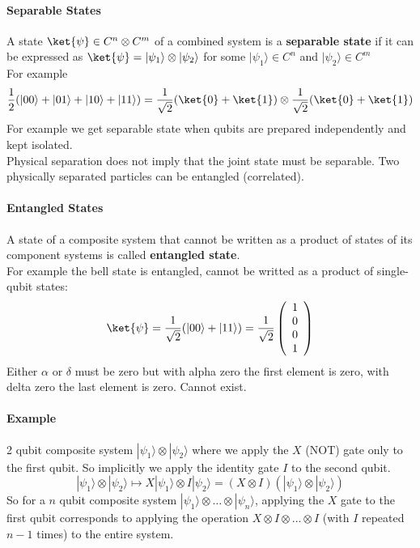 \documentclass[10pt]{report}
\begin{document}
\paragraph{Separable States} A state $\ket{\psi}\in C^n\otimes C^m$ of a combined system is a \textbf{separable state} if it can be expressed as $\ket{\psi} = |\psi_1\rangle\otimes|\psi_2\rangle$ for some $|\psi_1\rangle\in C^n$ and $|\psi_2\rangle\in C^m$\\
For example $$\frac{1}{2}(|00\rangle+|01\rangle+|10\rangle+|11\rangle) = \frac{1}{\sqrt{2}}(\ket{0} + \ket{1})\otimes \frac{1}{\sqrt{2}}(\ket{0}+\ket{1})$$
For example we get separable state when qubits are prepared independently and kept isolated.\\
Physical separation does not imply that the joint state must be separable. Two physically separated particles can be entangled (correlated).
\paragraph{Entangled States} A state of a composite system that cannot be written as a product of states of its component systems is called \textbf{entangled state}.\\
For example the bell state is entangled, cannot be writted as a product of single-qubit states:
$$\ket{\psi}=\frac{1}{\sqrt{2}}(|00\rangle+|11\rangle) = \frac{1}{\sqrt{2}}\left(\begin{array}{c}
1\\0\\0\\1
\end{array}\right)$$
Either $\alpha$ or $\delta$ must be zero but with alpha zero the first element is zero, with delta zero the last element is zero. Cannot exist.
\paragraph{Example} 2 qubit composite system $|\psi_1\rangle\otimes|\psi_2\rangle$ where we apply the $X$ (NOT) gate only to the first qubit. So implicitly we apply the identity gate $I$ to the second qubit.
$$|\psi_1\rangle\otimes|\psi_2\rangle\mapsto X|\psi_1\rangle\otimes I|\psi_2\rangle = (X\otimes I)(|\psi_1\rangle\otimes|\psi_2\rangle)$$
So for a $n$ qubit composite system $|\psi_1\rangle\otimes\ldots\otimes|\psi_n\rangle$, applying the $X$ gate to the first qubit corresponds to applying the operation $X\otimes I\otimes\ldots\otimes I$ (with $I$ repeated $n-1$ times) to the entire system.
\end{document}
